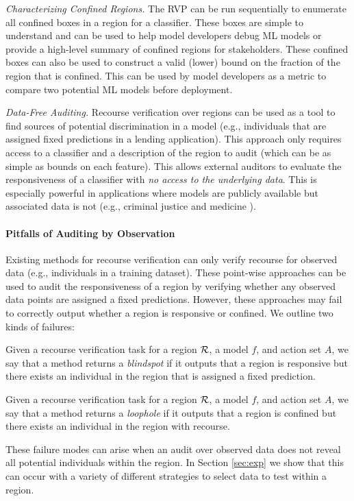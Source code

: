 \emph{Characterizing Confined Regions.} The RVP can be run sequentially to enumerate all confined boxes in a region for a classifier. These boxes are simple to understand and can be used to help model developers debug ML models or provide a high-level summary of confined regions for stakeholders. These confined boxes can also be used to construct a valid (lower) bound on the fraction of the region that is confined. This can be used by model developers as a metric to compare two potential ML models before deployment.

\emph{Data-Free Auditing.} Recourse verification over regions can be used as a tool to find sources of potential discrimination in a model (e.g., individuals that are assigned fixed predictions in a lending application). This approach only requires access to a classifier and a description of the region to audit (which can be as simple as bounds on each feature). This allows external auditors to evaluate the responsiveness of a classifier with \emph{no access to the underlying data}. This is especially powerful in applications where models are publicly available but associated data is not (e.g., criminal justice \cite{PennSentence} and medicine \cite{yamga2023optimized}). 

\paragraph{Pitfalls of Auditing by Observation}
Existing methods for recourse verification \citep[e.g.,][]{kothari2023prediction} can only verify recourse for observed data (e.g., individuals in a training dataset). These point-wise approaches can be used to audit the responsiveness of a region by verifying whether any observed data points are assigned a fixed predictions. However, these approaches may fail to correctly output whether a region is responsive or confined. We outline two kinds of failures:

\begin{definition}
Given a recourse verification task for a region ${\cal R}$, a model $f$, and action set $A$, we say that a method returns a \emph{blindspot} if it outputs that a region is responsive but there exists an individual in the region that is assigned a fixed prediction.
\end{definition}
%
\begin{definition}
Given a recourse verification task for a region ${\cal R}$, a model $f$, and action set $A$, we say that a method returns a \emph{loophole} if it outputs that a region is confined but there exists an individual in the region with recourse.
\end{definition}

These failure modes can arise when an audit over observed data does not reveal all potential individuals within the region. In Section \ref{sec:exp} we show that this can occur with a variety of different strategies to select data to test within a region.

